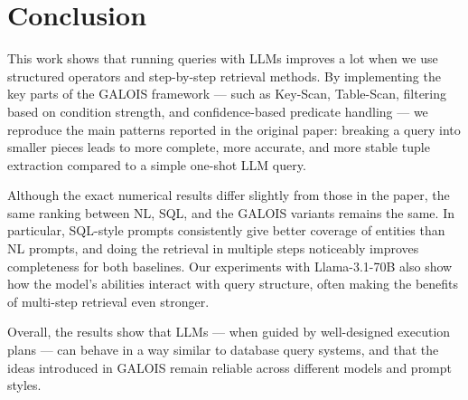 \documentclass[12pt]{article}
\begin{document}
\section{Conclusion}

This work shows that running queries with LLMs improves a lot when we use structured operators and step-by-step retrieval methods. By implementing the key parts of the GALOIS framework — such as Key-Scan, Table-Scan, filtering based on condition strength, and confidence-based predicate handling — we reproduce the main patterns reported in the original paper: breaking a query into smaller pieces leads to more complete, more accurate, and more stable tuple extraction compared to a simple one-shot LLM query.

Although the exact numerical results differ slightly from those in the paper, the same ranking between NL, SQL, and the GALOIS variants remains the same. In particular, SQL-style prompts consistently give better coverage of entities than NL prompts, and doing the retrieval in multiple steps noticeably improves completeness for both baselines. Our experiments with Llama-3.1-70B also show how the model’s abilities interact with query structure, often making the benefits of multi-step retrieval even stronger.

Overall, the results show that LLMs — when guided by well-designed execution plans — can behave in a way similar to database query systems, and that the ideas introduced in GALOIS remain reliable across different models and prompt styles.
\end{document}
